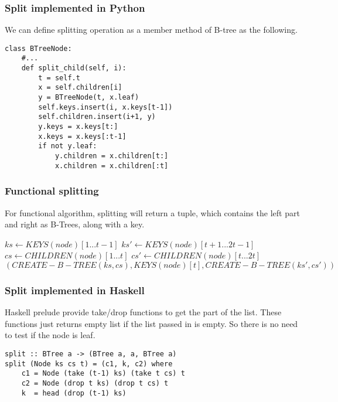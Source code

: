 \documentclass{article}
\begin{document}
\subsubsection*{Split implemented in Python}
We can define splitting operation as a member method of B-tree
as the following.

\lstset{language=Python}
\begin{lstlisting}
class BTreeNode:
    #...
    def split_child(self, i):
        t = self.t
        x = self.children[i]
        y = BTreeNode(t, x.leaf)
        self.keys.insert(i, x.keys[t-1])
        self.children.insert(i+1, y)
        y.keys = x.keys[t:]
        x.keys = x.keys[:t-1]
        if not y.leaf:
            y.children = x.children[t:]
            x.children = x.children[:t]
\end{lstlisting}

\subsubsection{Functional splitting}

For functional algorithm, splitting will return a tuple, which contains the
left part and right as B-Trees, along with a key.

\begin{algorithmic}[1]
  \State $ks \leftarrow KEYS(node)[1 ... t-1]$
  \State $ks' \leftarrow KEYS(node)[t+1 ... 2t-1]$
    \State $cs \leftarrow CHILDREN(node)[1 ... t]$
    \State $cs' \leftarrow CHILDREN(node)[t ... 2t]$
  \EndIf
  \State \Return $(CREATE-B-TREE(ks, cs), KEYS(node)[t], CREATE-B-TREE(ks', cs'))$
\EndFunction
\end{algorithmic}

\subsubsection*{Split implemented in Haskell}
Haskell prelude provide take/drop functions to get the part
of the list. These functions just returns empty list if the 
list passed in is empty. So there is no need to test if
the node is leaf.

\lstset{language=Haskell}
\begin{lstlisting}
split :: BTree a -> (BTree a, a, BTree a)
split (Node ks cs t) = (c1, k, c2) where
    c1 = Node (take (t-1) ks) (take t cs) t
    c2 = Node (drop t ks) (drop t cs) t
    k  = head (drop (t-1) ks)
\end{lstlisting}
\end{document}
